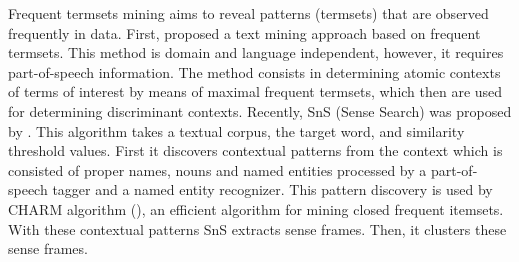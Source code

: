 Frequent termsets mining aims to reveal patterns (termsets) that are observed frequently in data. First, \cite{rybinski2008discovering} proposed a text mining approach based on frequent termsets. This method is domain and language independent, however, it requires part-of-speech information. The method consists in determining atomic contexts of
terms of interest by means of maximal frequent termsets, which then are used for determining discriminant contexts. Recently, SnS (Sense Search) was proposed by \cite{kozlowski2014sns}. This algorithm takes a textual corpus, the target word, and similarity threshold values. First it discovers contextual patterns from the context which is consisted of proper names, nouns and named entities processed by a part-of-speech tagger and a named entity recognizer. This pattern discovery is used by CHARM algorithm (\cite{zaki2002charm}), an efficient algorithm for mining closed frequent itemsets. With these contextual patterns SnS extracts sense frames. Then, it clusters these sense frames.


















